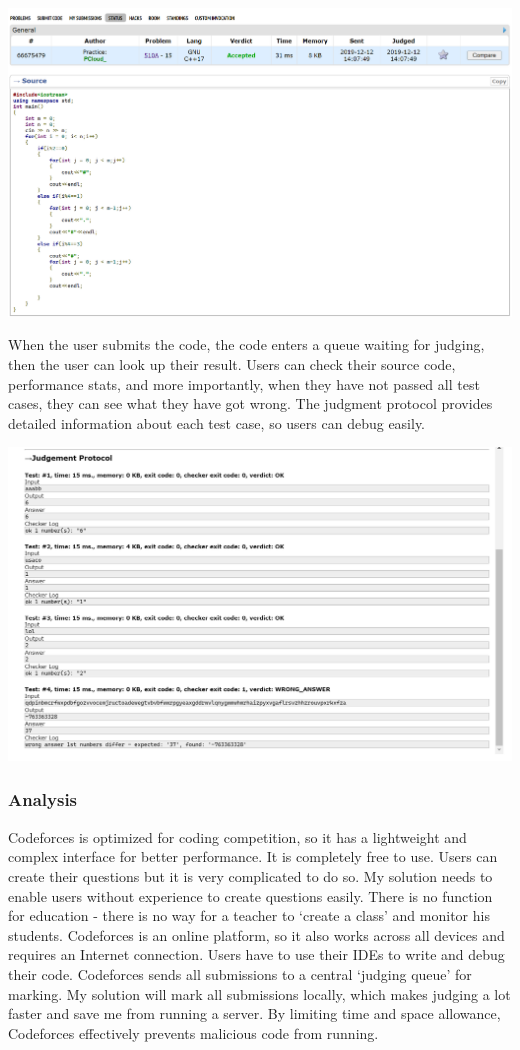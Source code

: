 \documentclass[a4paper]{report}
\begin{document}
\includegraphics[width=\linewidth]{Submission-66675479-Codeforces}

When the user submits the code, the code enters a queue waiting for judging, then the user can look up their result. Users can check their source code, performance stats, and more importantly, when they have not passed all test cases, they can see what they have got wrong. The judgment protocol provides detailed information about each test case, so users can debug easily.

\includegraphics[width=\linewidth]{Judgement-Protocol-Codeforces}

\subsubsection{Analysis}

Codeforces is optimized for coding competition, so it has a lightweight and complex interface for better performance. It is completely free to use. Users can create their questions but it is very complicated to do so. My solution needs to enable users without experience to create questions easily. There is no function for education - there is no way for a teacher to `create a class' and monitor his students. Codeforces is an online platform, so it also works across all devices and requires an Internet connection. Users have to use their IDEs to write and debug their code. Codeforces sends all submissions to a central `judging queue' for marking. My solution will mark all submissions locally, which makes judging a lot faster and save me from running a server. By limiting time and space allowance, Codeforces effectively prevents malicious code from running.
\end{document}
